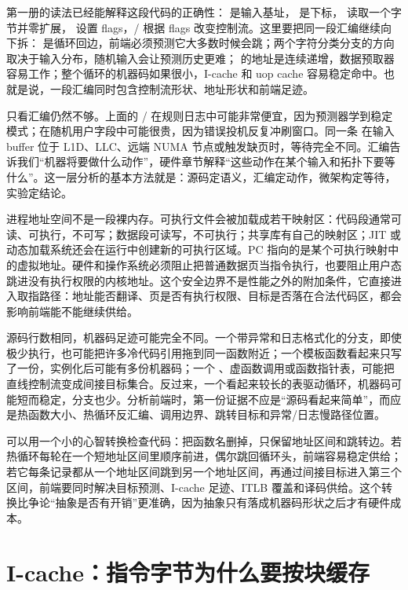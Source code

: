 第一册的读法已经能解释这段代码的正确性： 是输入基址， 是下标， 读取一个字节并零扩展， 设置 flags，/ 根据 flags 改变控制流。这里要把同一段汇编继续向下拆： 是循环回边，前端必须预测它大多数时候会跳；两个字符分类分支的方向取决于输入分布，随机输入会让预测历史更难； 的地址是连续递增，数据预取器容易工作；整个循环的机器码如果很小，I-cache 和 uop cache 容易稳定命中。也就是说，一段汇编同时包含控制流形状、地址形状和前端足迹。

只看汇编仍然不够。上面的 / 在规则日志中可能非常便宜，因为预测器学到稳定模式；在随机用户字段中可能很贵，因为错误投机反复冲刷窗口。同一条  在输入 buffer 位于 L1D、LLC、远端 NUMA 节点或触发缺页时，等待完全不同。汇编告诉我们“机器将要做什么动作”，硬件章节解释“这些动作在某个输入和拓扑下要等什么”。这一层分析的基本方法就是：源码定语义，汇编定动作，微架构定等待，实验定结论。

进程地址空间不是一段裸内存。可执行文件会被加载成若干映射区：代码段通常可读、可执行，不可写；数据段可读写，不可执行；共享库有自己的映射区；JIT 或动态加载系统还会在运行中创建新的可执行区域。PC 指向的是某个可执行映射中的虚拟地址。硬件和操作系统必须阻止把普通数据页当指令执行，也要阻止用户态跳进没有执行权限的内核地址。这个安全边界不是性能之外的附加条件，它直接进入取指路径：地址能否翻译、页是否有执行权限、目标是否落在合法代码区，都会影响前端能不能继续供给。

源码行数相同，机器码足迹可能完全不同。一个带异常和日志格式化的分支，即使极少执行，也可能把许多冷代码引用拖到同一函数附近；一个模板函数看起来只写了一份，实例化后可能有多份机器码；一个 、虚函数调用或函数指针表，可能把直线控制流变成间接目标集合。反过来，一个看起来较长的表驱动循环，机器码可能短而稳定，分支也少。分析前端时，第一份证据不应是“源码看起来简单”，而应是热函数大小、热循环反汇编、调用边界、跳转目标和异常/日志慢路径位置。

可以用一个小的心智转换检查代码：把函数名删掉，只保留地址区间和跳转边。若热循环每轮在一个短地址区间里顺序前进，偶尔跳回循环头，前端容易稳定供给；若它每条记录都从一个地址区间跳到另一个地址区间，再通过间接目标进入第三个区间，前端要同时解决目标预测、I-cache 足迹、ITLB 覆盖和译码供给。这个转换比争论“抽象是否有开销”更准确，因为抽象只有落成机器码形状之后才有硬件成本。

\section{I-cache：指令字节为什么要按块缓存}

